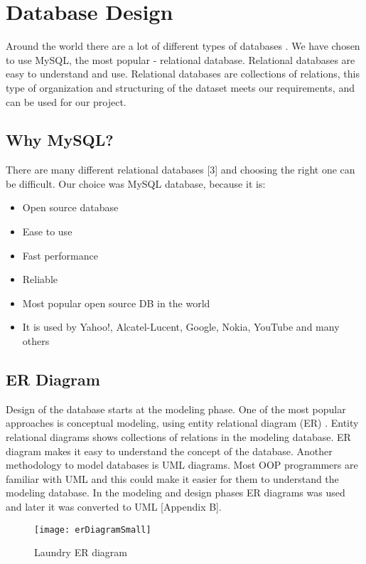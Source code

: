 %
\section{Database Design}

Around the world there are a lot of different types of databases \cite{bib1}. We have chosen to use MySQL, the most popular - relational database. Relational databases are easy to understand \cite{bib2} and use. Relational databases are collections of relations, this type of organization and structuring of the dataset meets our requirements, and can be used for our project.

\subsection{Why MySQL?}

There are many different relational databases [3] and choosing the right one can be difficult. Our choice was MySQL database, because it is:

\begin{itemize}
	\item Open source database
	\item Ease to use
	\item Fast performance
	\item Reliable 
	\item Most popular open source DB in the world
	\item It is used by Yahoo!, Alcatel-Lucent, Google, Nokia, YouTube and many others
\end{itemize}

\subsection{ER Diagram}

Design of the database starts at the modeling phase. One of the most popular approaches is conceptual modeling, using entity relational diagram (ER) \cite{bib4}. Entity relational diagrams shows collections of relations in the modeling database. ER diagram makes it easy to understand the concept of the database. Another methodology to model databases is UML diagrams. Most OOP programmers are familiar with UML and this could make it easier for them to understand the modeling database. In the modeling and design phases ER diagrams was used and later it was converted to UML [Appendix B].

\begin{figure}[h]
	\centering
		\texttt{[image: erDiagramSmall]}
	\caption{Laundry ER diagram}
	\label{fig:planning}
\end{figure}

